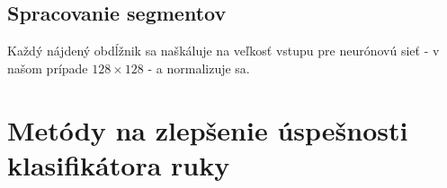 \subsection{Spracovanie segmentov}
Každý nájdený obdĺžnik sa naškáluje na veľkosť vstupu pre neurónovú sieť - v našom prípade $128\times 128$ - a normalizuje sa.

\section{Metódy na zlepšenie úspešnosti klasifikátora ruky}
